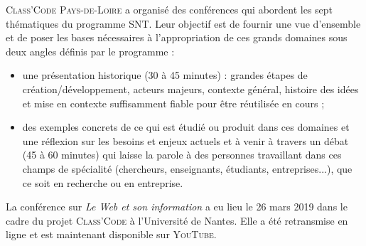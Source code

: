 \textsc{Class'Code} \textsc{Pays-de-Loire} a organisé des conférences qui abordent les sept thématiques du programme SNT. Leur objectif est de fournir une vue d’ensemble et de poser les bases nécessaires à l’appropriation de ces grands domaines sous deux angles définis par le programme :
\begin{itemize}
\item une présentation historique (30 à 45 minutes) : grandes étapes de création/développement, acteurs majeurs, contexte général, histoire des idées et mise en contexte suffisamment fiable pour être réutilisée en cours ;
\item des exemples concrets de ce qui est étudié ou produit dans ces domaines et une réflexion sur les besoins et enjeux actuels et à venir à travers un débat (45 à 60 minutes) qui laisse la parole à des personnes travaillant dans ces champs de spécialité  (chercheurs, enseignants, étudiants, entreprises...), que ce soit en recherche ou en entreprise.
\end{itemize}

La conférence sur \textit{Le Web et son information} a eu lieu le 26 mars 2019  dans le cadre du projet \textsc{Class'Code} à l’Université de Nantes. Elle a été retransmise en ligne et est maintenant disponible sur \textsc{YouTube}.

